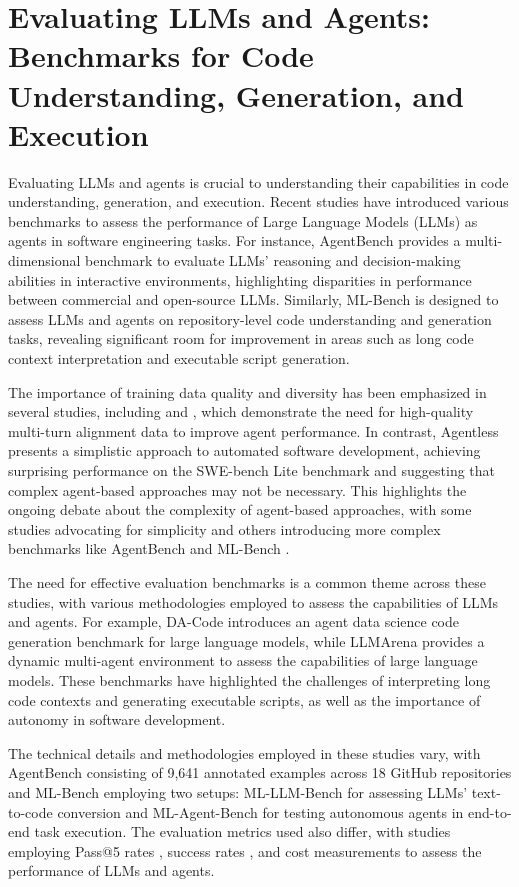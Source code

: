 \documentclass[conference]{IEEEtran}
\begin{document}
\section{Evaluating LLMs and Agents: Benchmarks for Code Understanding, Generation, and Execution}
Evaluating LLMs and agents is crucial to understanding their capabilities in code understanding, generation, and execution. Recent studies have introduced various benchmarks to assess the performance of Large Language Models (LLMs) as agents in software engineering tasks. For instance, AgentBench \cite{2308.03688} provides a multi-dimensional benchmark to evaluate LLMs' reasoning and decision-making abilities in interactive environments, highlighting disparities in performance between commercial and open-source LLMs. Similarly, ML-Bench \cite{2311.09835} is designed to assess LLMs and agents on repository-level code understanding and generation tasks, revealing significant room for improvement in areas such as long code context interpretation and executable script generation.

The importance of training data quality and diversity has been emphasized in several studies, including \cite{2308.03688} and \cite{2311.09835}, which demonstrate the need for high-quality multi-turn alignment data to improve agent performance. In contrast, Agentless \cite{2407.01489} presents a simplistic approach to automated software development, achieving surprising performance on the SWE-bench Lite benchmark and suggesting that complex agent-based approaches may not be necessary. This highlights the ongoing debate about the complexity of agent-based approaches, with some studies advocating for simplicity \cite{2407.01489} and others introducing more complex benchmarks like AgentBench \cite{2308.03688} and ML-Bench \cite{2311.09835}.

The need for effective evaluation benchmarks is a common theme across these studies, with various methodologies employed to assess the capabilities of LLMs and agents. For example, DA-Code \cite{2410.07331} introduces an agent data science code generation benchmark for large language models, while LLMArena \cite{2402.16499} provides a dynamic multi-agent environment to assess the capabilities of large language models. These benchmarks have highlighted the challenges of interpreting long code contexts and generating executable scripts, as well as the importance of autonomy in software development.

The technical details and methodologies employed in these studies vary, with AgentBench \cite{2308.03688} consisting of 9,641 annotated examples across 18 GitHub repositories and ML-Bench \cite{2311.09835} employing two setups: ML-LLM-Bench for assessing LLMs' text-to-code conversion and ML-Agent-Bench for testing autonomous agents in end-to-end task execution. The evaluation metrics used also differ, with studies employing Pass@5 rates \cite{2308.03688}, success rates \cite{2311.09835}, and cost measurements \cite{2407.01489} to assess the performance of LLMs and agents.
\end{document}
